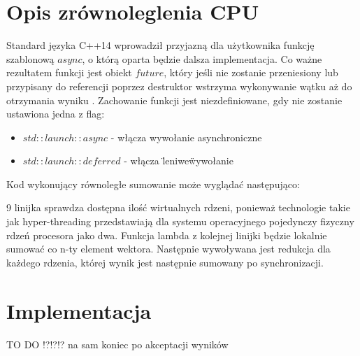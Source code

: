 \section{Opis zrównoleglenia CPU}
\label{sec:opis_cpu}
Standard języka C++14 wprowadził przyjazną dla użytkownika funkcję szablonową $async$, o którą oparta będzie dalsza implementacja. Co ważne rezultatem funkcji jest obiekt $future$, który jeśli nie zostanie przeniesiony lub przypisany do referencji poprzez destruktor wstrzyma wykonywanie wątku aż do otrzymania wyniku \cite{CppRefAsync}. Zachowanie funkcji jest niezdefiniowane, gdy nie zostanie ustawiona jedna z flag:
\begin{itemize}
\item $std::launch::async$ - włącza wywołanie asynchroniczne
\item $std::launch::deferred$ - włącza \"leniwe\" wywołanie
\end{itemize}
Kod wykonujący równoległe sumowanie może wyglądać następująco:

9 linijka sprawdza dostępna ilość wirtualnych rdzeni, ponieważ technologie takie jak hyper-threading przedstawiają dla systemu operacyjnego pojedynczy fizyczny rdzeń procesora jako dwa. Funkcja lambda z kolejnej linijki będzie lokalnie sumować co n-ty element wektora. Następnie wywoływana jest redukcja dla każdego rdzenia, której wynik jest następnie sumowany po synchronizacji.

\section{Implementacja}
\label{sec:implementacja}
TO DO !?!?!? na sam koniec po akceptacji wyników